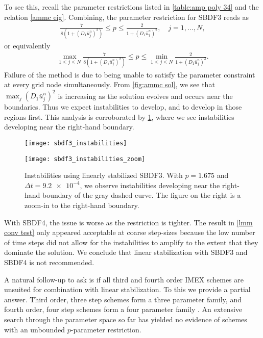 To see this, recall the parameter restrictions listed in \cref{table:amp poly 34} and the relation \cref{ammc eig}. Combining, the parameter restriction for SBDF3 reads as
\begin{align}
        \frac{7}{8(1 + (D_1\bar u^n_j)^2)} \leq p \leq \frac{2}{1 + (D_1 \bar u^n_j)^2},
\quad j=1,\dots,N,
\end{align}
or equivalently
\begin{align} 
\max_{1\leq j\leq N}\frac{7}{8(1 + (D_1\bar u^n_j)^2)} \leq p 
\leq \min_{1\leq j\leq N}\frac{2}{1 + (D_1 \bar u^n_j)^2}.
\end{align}
Failure of the method is due to being unable to satisfy the parameter constraint at every grid node simultaneously. From \cref{fig:ammc sol}, we see that $\max_j (D_1 \bar u^n_j)^2$ is increasing as the solution evolves and occurs near the boundaries. Thus we expect instabilities to develop, and to develop in those regions first. This analysis is corroborated by \cref{fig:sbdf3 instab}, where we see instabilities developing near the right-hand boundary.
\begin{figure}[htb!]
        \centering
\begin{minipage}{0.45\textwidth}
       \texttt{[image: sbdf3\_instabilities]}
\end{minipage}
\begin{minipage}{0.45\textwidth}
       \texttt{[image: sbdf3\_instabilities\_zoom]}
\end{minipage}
\caption[Instabilities using linearly stabilized SBDF3]{Instabilities using linearly stabilized SBDF3. With $p=1.675$ and $\Delta t=\num{9.2e-4}$, we observe instabilities developing near the right-hand boundary of the gray dashed curve. The figure on the right is a zoom-in to the right-hand boundary.}
\label{fig:sbdf3 instab}
\end{figure}

With SBDF4, the issue is worse as the restriction is tighter. The result in \cref{lmm conv test} only appeared acceptable at coarse step-sizes because the low number of time steps did not allow for the instabilities to amplify to the extent that they dominate the solution. We conclude that linear stabilization with SBDF3 and SBDF4  is not recommended. 

A natural follow-up to ask is if all third and fourth order IMEX schemes are unsuited for combination with linear stabilization. To this we provide a partial answer. Third order, three step schemes form a three parameter family, and fourth order, four step schemes form a four parameter family \cite{ascher1995implicit}. An extensive search through the parameter space so far has yielded no evidence of schemes with an unbounded $p$-parameter restriction.

